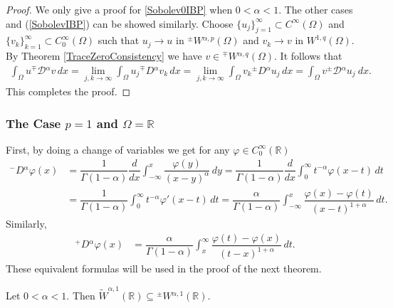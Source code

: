 \documentclass[leqno,final]{siamltex}
\numberwithin{equation}{section}
\renewcommand{\(}{\bigl(}
\renewcommand{\)}{\bigr)}
\newcommand{\R}{\mathbb{R}}
\begin{document}
    \begin{proof}
        We only give a proof for \eqref{Sobolev0IBP} when $0 < \alpha <1$. The other cases and (\ref{SobolevIBP}) can be showed similarly. 
        Choose $\{u_j\}_{j=1}^{\infty} \subset {}{C}^{\infty}(\Omega)$
        	and $\{v_k\}_{k=1}^{\infty} \subset C^{\infty}_0(\Omega)$ 
        such that $u_j\to u$ in ${^{\pm}}{W}{^{\alpha,p}}(\Omega)$ and  
          $v_k \rightarrow v$ in $W^{1,q}(\Omega)$. By Theorem \ref{TraceZeroConsistency} we have 
        $v \in {^{\mp}}{W}{^{\alpha,q}}(\Omega)$. It follows that 
        \begin{align*}
            \int_{\Omega} u {^{\mp}}{\mathcal{D}}{^{\alpha}} v\, dx = \lim_{j,k \rightarrow \infty} \int_{\Omega} u_j {^{\mp}}{D}{^{\alpha}} v_k\, dx 
            = \lim_{j,k \rightarrow \infty} \int_{\Omega} v_k {^{\pm}}{D}{^{\alpha}} u_j \, dx
            = \int_{\Omega} v {^{\pm}}{\mathcal{D}}{^{\alpha}} u_j\ dx.
        \end{align*}
        This completes the proof.
    \end{proof}
    
    
    \subsubsection{\bf The Case $p=1$ and $\Omega = \R$}\label{sec-4.6.2}
       First, by doing a change of variables we get for any $\varphi \in C^{\infty}_{0}(\R)$ 
        \begin{align*}
                {^{-}}{D}{^{\alpha}} \varphi(x) &= \dfrac{1}{\Gamma(1- \alpha)} \dfrac{d}{dx} \int_{-\infty}^{x} \dfrac{\varphi(y)}{(x-y)^{\alpha}} \,dy 
                = \dfrac{1}{\Gamma(1 - \alpha)} \dfrac{d}{dx} \int_{0}^{\infty} t^{-\alpha} \varphi(x-t)\,dt\\ 
                &= \dfrac{1}{\Gamma(1- \alpha)} \int_{0}^{\infty} t^{-\alpha} \varphi'(x-t)\,dt  
                = \dfrac{\alpha}{\Gamma(1- \alpha)} \int_{-\infty}^{x} \dfrac{\varphi(x) - \varphi(t)}{(x-t)^{1+\alpha}}\,dt.
        \end{align*}
        Similarly, 
        \begin{align*}
            {^{+}}{D}{^{\alpha}}\varphi(x) &= \dfrac{\alpha}{\Gamma(1 - \alpha)} 
            \int_{x}^{\infty} \dfrac{ \varphi(t) - \varphi(x) }{(t-x)^{1 + \alpha}}\,dt.
        \end{align*}
        These equivalent formulas will be used in the proof of the next theorem. 

        \begin{theorem}
            Let $0<\alpha<1$. Then $\widetilde{W}^{\alpha,1}(\R) \subseteq {^{\pm}}{W}{^{\alpha,1}}(\R)$.
        \end{theorem}
        
\end{document}
